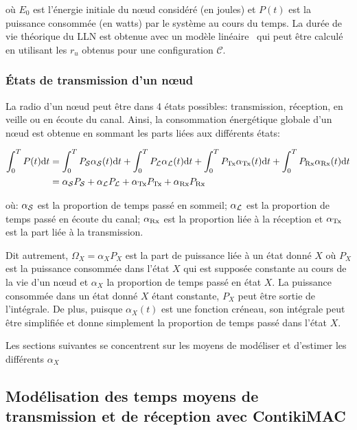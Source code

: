 où $E_0$ est l'énergie initiale du nœud considéré (en joules) et $P(t)$ est la puissance consommée (en watts) par le système au cours du temps.
La durée de vie théorique du \ac{LLN} est obtenue avec un modèle linéaire~\cite{chen2005lifetime} qui peut être calculé en utilisant les $r_u$ obtenus pour une configuration $\mathcal{C}$.

\subsubsection{États de transmission d'un nœud}

La radio d'un nœud peut être dans 4 états possibles: transmission, réception, en veille ou en écoute du canal.
Ainsi, la consommation énergétique globale d'un nœud est obtenue en sommant les parts liées aux différents états:

\begin{align}
  \int_0^T P(t) \mathrm{d}t &= \int_0^T P_{\mathcal{S}} \alpha_{\mathcal{S}}(t) \mathrm{d}t + \int_0^T P_{\mathcal{L}} \alpha_{\mathcal{L}}(t) \mathrm{d}t + \int_0^T P_{\textrm{Tx}} \alpha_{\textrm{Tx}}(t) \mathrm{d}t + \int_0^T P_{\textrm{Rx}} \alpha_{\textrm{Rx}}(t) \mathrm{d}t\\
  &= \alpha_{\mathcal{S}} P_{\mathcal{S}} + \alpha_{\mathcal{L}} P_{\mathcal{L}} + \alpha_{\textrm{Tx}} P_{\textrm{Tx}} + \alpha_{\textrm{Rx}} P_{\textrm{Rx}}
  \label{contikimac:eq:omega_tot}
\end{align}

où: $\alpha_{\mathcal{S}}$ est la proportion de temps passé en sommeil; $\alpha_{\mathcal{L}}$ est la proportion de temps passé en écoute du canal; $\alpha_{\textrm{Rx}}$ est la proportion liée à la réception et $\alpha_{\textrm{Tx}}$ est la part liée à la transmission.

Dit autrement, $\Omega_X = \alpha_X P_X$ est la part de puissance liée à un état donné $X$ où $P_X$ est la puissance consommée dans l'état $X$ qui est supposée constante au cours de la vie d'un nœud et $\alpha_X$ la proportion de temps passé en état $X$.
La puissance consommée dans un état donné $X$ étant constante, $P_X$ peut être sortie de l'intégrale.
De plus, puisque $\alpha_X(t)$ est une fonction créneau, son intégrale peut être simplifiée et donne simplement la proportion de temps passé dans l'état $X$.

Les sections suivantes se concentrent sur les moyens de modéliser et d'estimer les différents $\alpha_X$

\subsection{Modélisation des temps moyens de transmission et de réception avec ContikiMAC}

